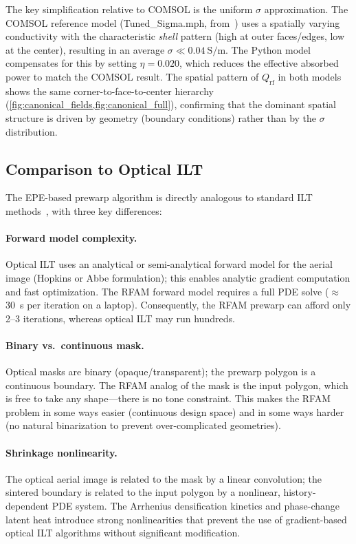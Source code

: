 \documentclass[5p,times]{elsarticle}
\newcommand{\Qrf}{Q_{\mathrm{rf}}}
\begin{document}
The key simplification relative to COMSOL is the uniform $\sigma$
approximation.  The COMSOL reference model (Tuned\_Sigma.mph,
from~\cite{allison2022computational,allisonDissertation}) uses a
spatially varying conductivity with the characteristic \emph{shell}
pattern (high at outer faces/edges, low at the center), resulting in
an average $\sigma \ll \SI{0.04}{\siemens\per\meter}$.  The Python
model compensates for this by setting $\eta = 0.020$, which reduces
the effective absorbed power to match the COMSOL result.  The spatial
pattern of $\Qrf$ in both models shows the same corner-to-face-to-center
hierarchy (\cref{fig:canonical_fields,fig:canonical_full}), confirming
that the dominant spatial structure is driven by geometry (boundary
conditions) rather than by the $\sigma$ distribution.

\subsection{Comparison to Optical ILT}

The EPE-based prewarp algorithm is directly analogous to standard ILT
methods~\cite{zhang2023fast,zhu2024l2o,poonawala2007mask}, with three key differences:

\paragraph{Forward model complexity.}
Optical ILT uses an analytical or semi-analytical forward model for the
aerial image (Hopkins or Abbe formulation); this enables analytic
gradient computation and fast optimization.  The RFAM forward model
requires a full PDE solve ($\approx$\SI{30}{\second} per iteration on a
laptop).  Consequently, the RFAM prewarp can afford only 2--3 iterations,
whereas optical ILT may run hundreds.

\paragraph{Binary vs.\ continuous mask.}
Optical masks are binary (opaque/transparent); the prewarp polygon is
a continuous boundary.  The RFAM analog of the mask is the input
polygon, which is free to take any shape---there is no tone
constraint.  This makes the RFAM problem in some ways easier
(continuous design space) and in some ways harder (no natural
binarization to prevent over-complicated geometries).

\paragraph{Shrinkage nonlinearity.}
The optical aerial image is related to the mask by a linear
convolution; the sintered boundary is related to the input polygon by
a nonlinear, history-dependent PDE system.  The Arrhenius densification
kinetics and phase-change latent heat introduce strong nonlinearities
that prevent the use of gradient-based optical ILT algorithms without
significant modification.
\end{document}
